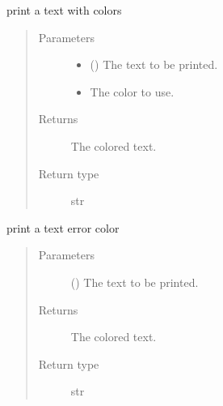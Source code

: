 \documentclass[a4paper,10pt,english]{sphinxmanual}
\begin{document}
\begin{fulllineitems}
\label{\detokenize{commands/apidoc/src:src.printcolors.printc}}
print a text with colors
\begin{quote}\begin{description}
\item[{Parameters}] \leavevmode\begin{itemize}
\item {} 
 () \textendash{} The text to be printed.

\item {} 
 \textendash{} The color to use.

\end{itemize}

\item[{Returns}] \leavevmode
The colored text.

\item[{Return type}] \leavevmode
str

\end{description}\end{quote}

\end{fulllineitems}


\begin{fulllineitems}
\label{\detokenize{commands/apidoc/src:src.printcolors.printcError}}
print a text error color
\begin{quote}\begin{description}
\item[{Parameters}] \leavevmode
{} () \textendash{} The text to be printed.

\item[{Returns}] \leavevmode
The colored text.

\item[{Return type}] \leavevmode
str

\end{description}\end{quote}

\end{fulllineitems}
\end{document}

